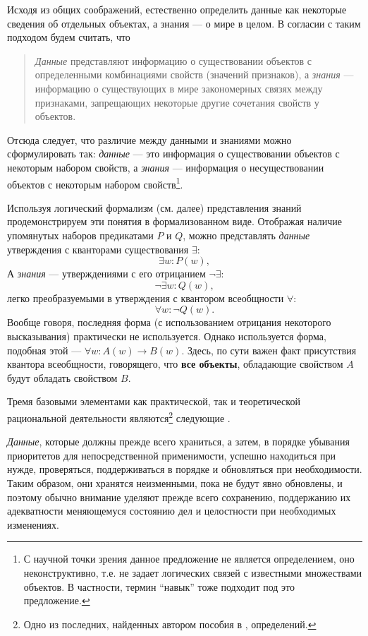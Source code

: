 \documentclass[12pt, openany, twoside]{book} %
\begin{document}
Исходя из общих соображений, естественно определить данные как некоторые сведения об отдельных объектах, а знания --- о мире в целом. В согласии с таким подходом будем считать, что
\begin{quote}
{\em Данные} представляют информацию о существовании объектов с определенными комбинациями свойств\linebreak{} (значений признаков), а {\em знания} --- информацию о существующих в мире закономерных связях между признаками, запрещающих некоторые другие сочетания свойств у объектов.
\end{quote}

Отсюда следует, что различие между данными и знаниями можно сфор\-му\-ли\-ро\-вать так: {\em данные} --- это информация о существовании объектов с некоторым набором свойств, а {\em знания} --- информация о несуществовании объектов с некоторым набором свойств\footnote{С научной точки зрения данное предложение не является определением, оно неконструктивно, т.е. не задает логических связей с известными множествами объектов. В частности, термин ``навык'' тоже подходит под это предложение.}.

Используя логический формализм (см. далее) представления знаний продемонстрируем эти понятия в формализованном виде. Отображая наличие упомянутых наборов предикатами $P$ и $Q$, можно представлять {\em данные} утверждения с кванторами существования
$\exists$:
$$
    \exists w: P(w),
$$
А {\em знания} --- утверждениями с его отрицанием $\neg\exists$:
$$
    \neg\exists w: Q(w),
$$
легко преобразуемыми в утверждения с квантором всеобщности
$\forall$:
$$
    \forall w: \neg Q(w).
$$
Вообще говоря, последняя форма (с использованием отрицания некоторого высказывания) практически не используется. Однако используется форма, подобная этой --- $\forall w: A(w)\to B(w)$. Здесь, по сути важен факт присутствия квантора всеобщности, говорящего, что {\bf все объекты}, обладающие свойством $A$ будут обладать свойством $B$.

Тремя базовыми элементами как практической, так и теоретической рациональной деятельности являются\footnote{Одно из последних, найденных автором пособия в \cite{DDWII}, определений.} следующие \cite{DDWII}.

    {\em Данные}, которые должны прежде всего храниться, а затем, в порядке убывания приоритетов для непосредственной применимости, успешно находиться при нужде, проверяться, поддерживаться в порядке и обновляться при необходимости. Таким образом, они хранятся неизменными, пока не будут явно обновлены, и поэтому обычно внимание уделяют прежде всего сохранению, поддержанию их адекватности меняющемуся состоянию дел и целостности при необходимых изменениях.
\end{document}
